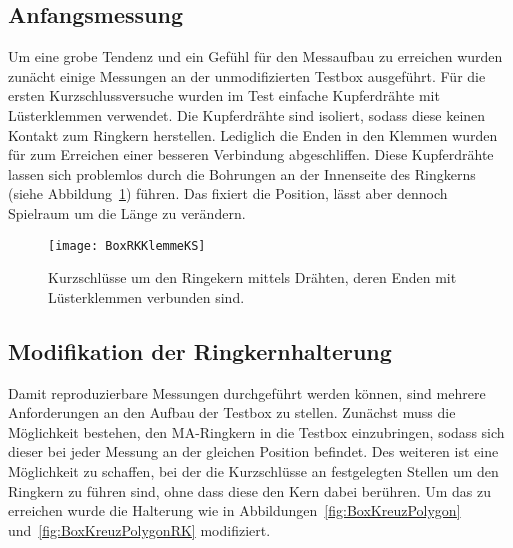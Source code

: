 \subsection{Anfangsmessung}
Um eine grobe Tendenz und ein Gef\"uhl f\"ur den Messaufbau zu erreichen wurden zun\"acht einige Messungen an der unmodifizierten Testbox ausgef\"uhrt. 
F\"ur die ersten Kurzschlussversuche wurden im Test einfache Kupferdr\"ahte mit L\"usterklemmen verwendet. Die Kupferdr\"ahte sind isoliert, sodass diese keinen Kontakt zum Ringkern herstellen. Lediglich die Enden in den Klemmen wurden für zum Erreichen einer besseren Verbindung abgeschliffen. Diese Kupferdr\"ahte lassen sich problemlos durch die Bohrungen an der Innenseite des Ringkerns (siehe Abbildung~\ref{fig:innenKern}) f\"uhren. Das fixiert die Position, l\"asst aber dennoch Spielraum um die L\"ange zu ver\"andern.
\par
\begin{figure}[htb]
		\centering
		\texttt{[image: BoxRKKlemmeKS]}
		\caption{Kurzschl\"usse um den Ringekern mittels Dr\"ahten, deren Enden mit L\"usterklemmen verbunden sind.}
		\label{fig:innenKern}
\end{figure}

\newpage



\subsection{Modifikation der Ringkernhalterung}
Damit reproduzierbare Messungen durchgef\"uhrt werden k\"onnen, sind mehrere Anforderungen an den Aufbau der Testbox zu stellen. Zun\"achst muss die M\"oglichkeit bestehen, den MA-Ringkern in die Testbox einzubringen, sodass sich dieser bei jeder Messung an der gleichen Position befindet. Des weiteren ist eine M\"oglichkeit zu schaffen, bei der die Kurzschl\"usse an festgelegten  Stellen um den Ringkern zu f\"uhren sind, ohne dass diese den Kern dabei ber\"uhren. Um das zu erreichen wurde die Halterung wie in Abbildungen~\ref{fig:BoxKreuzPolygon} und~\ref{fig:BoxKreuzPolygonRK} modifiziert.



